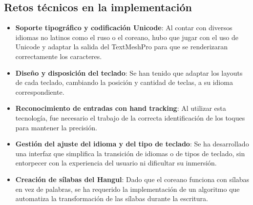 \subsection{Retos técnicos en la implementación}

\begin{itemize}
	\item \textbf{Soporte tipográfico y codificación Unicode}: Al contar con diversos idiomas no latinos como el ruso o el coreano, hubo que jugar con el uso de Unicode y adaptar la salida del TextMeshPro para que se renderizaran correctamente los caracteres.
	\item \textbf{Diseño y disposición del teclado}: Se han tenido que adaptar los layouts de cada teclado, cambiando la posición y cantidad de teclas, a su idioma correspondiente.
	\item \textbf{Reconocimiento de entradas con hand tracking}: Al utilizar esta tecnología, fue necesario el trabajo de la correcta identificación de los toques para mantener la precisión.
	\item \textbf{Gestión del ajuste del idioma y del tipo de teclado}: Se ha desarrollado una interfaz que simplifica la transición de idiomas o de tipos de teclado, sin entorpecer con la experiencia del usuario ni dificultar su inmersión.
	\item \textbf{Creación de sílabas del Hangul}: Dado que el coreano funciona con sílabas en vez de palabras, se ha requerido la implementación de un algoritmo que automatiza la transformación de las sílabas durante la escritura.
\end{itemize}



